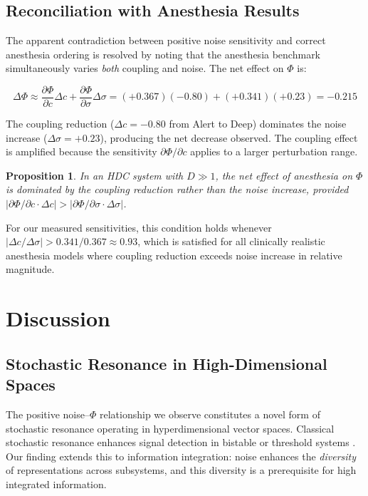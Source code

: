 \documentclass[12pt,a4paper]{article}
\newtheorem{proposition}{Proposition}
\begin{document}
\subsection{Reconciliation with Anesthesia Results}

The apparent contradiction between positive noise sensitivity and correct anesthesia ordering is resolved by noting that the anesthesia benchmark simultaneously varies \emph{both} coupling and noise. The net effect on $\Phi$ is:

\begin{equation}
\Delta\Phi \approx \frac{\partial\Phi}{\partial c} \Delta c + \frac{\partial\Phi}{\partial \sigma} \Delta\sigma = (+0.367)(-0.80) + (+0.341)(+0.23) = -0.215
\end{equation}

The coupling reduction ($\Delta c = -0.80$ from Alert to Deep) dominates the noise increase ($\Delta\sigma = +0.23$), producing the net decrease observed. The coupling effect is amplified because the sensitivity $\partial\Phi/\partial c$ applies to a larger perturbation range.

\begin{proposition}
In an HDC system with $D \gg 1$, the net effect of anesthesia on $\Phi$ is dominated by the coupling reduction rather than the noise increase, provided $|\partial\Phi/\partial c \cdot \Delta c| > |\partial\Phi/\partial\sigma \cdot \Delta\sigma|$.
\end{proposition}

For our measured sensitivities, this condition holds whenever $|\Delta c / \Delta\sigma| > 0.341/0.367 \approx 0.93$, which is satisfied for all clinically realistic anesthesia models where coupling reduction exceeds noise increase in relative magnitude.

\section{Discussion}

\subsection{Stochastic Resonance in High-Dimensional Spaces}

The positive noise--$\Phi$ relationship we observe constitutes a novel form of stochastic resonance operating in hyperdimensional vector spaces. Classical stochastic resonance enhances signal detection in bistable or threshold systems \citep{gammaitoni1998stochastic}. Our finding extends this to information integration: noise enhances the \emph{diversity} of representations across subsystems, and this diversity is a prerequisite for high integrated information.
\end{document}
